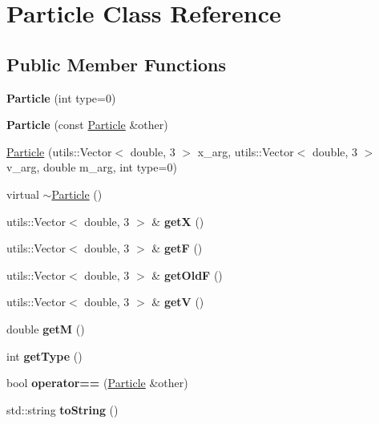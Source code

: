 \hypertarget{class_particle}{}\section{Particle Class Reference}
\label{class_particle}
\subsection*{Public Member Functions}
\begin{DoxyCompactItemize}
\item 
\mbox{\label{class_particle_a866812d3dfb9c539e5e24593e596a8c9}} 
{\bfseries Particle} (int type=0)
\item 
\mbox{\label{class_particle_a24b04cb7c6f7ea4242d25c410f44ae56}} 
{\bfseries Particle} (const \mbox{\hyperlink{class_particle}{Particle}} \&other)
\item 
\mbox{\hyperlink{class_particle_a5a5b07aa732c302b45e90c12723f2b27}{Particle}} (utils\+::\+Vector$<$ double, 3 $>$ x\+\_\+arg, utils\+::\+Vector$<$ double, 3 $>$ v\+\_\+arg, double m\+\_\+arg, int type=0)
\item 
virtual \mbox{\hyperlink{class_particle_ad030d0fe7b88cf81744b127c99244ff4}{$\sim$\+Particle}} ()
\item 
\mbox{\label{class_particle_ab7ade5dc156dfa0234aa0323564e46ed}} 
utils\+::\+Vector$<$ double, 3 $>$ \& {\bfseries getX} ()
\item 
\mbox{\label{class_particle_acd84c445e2bd5f5280a00e76cfe73fe0}} 
utils\+::\+Vector$<$ double, 3 $>$ \& {\bfseries getF} ()
\item 
\mbox{\label{class_particle_a1204435fc08c697b0fea230616d1bbdf}} 
utils\+::\+Vector$<$ double, 3 $>$ \& {\bfseries get\+OldF} ()
\item 
\mbox{\label{class_particle_aaf3ecbc6e1e31b259fe239461ba13dbd}} 
utils\+::\+Vector$<$ double, 3 $>$ \& {\bfseries getV} ()
\item 
\mbox{\label{class_particle_aa1ca800f9be9dd4bd6c604f608095b24}} 
double {\bfseries getM} ()
\item 
\mbox{\label{class_particle_a0581d7b629eb17ac5bef8e934852ca8b}} 
int {\bfseries get\+Type} ()
\item 
\mbox{\label{class_particle_a5034babb77618a56e00927d8891afabe}} 
bool {\bfseries operator==} (\mbox{\hyperlink{class_particle}{Particle}} \&other)
\item 
\mbox{\label{class_particle_a07d071a0f91f8ce7413201a6db3afe7b}} 
std\+::string {\bfseries to\+String} ()
\end{DoxyCompactItemize}


